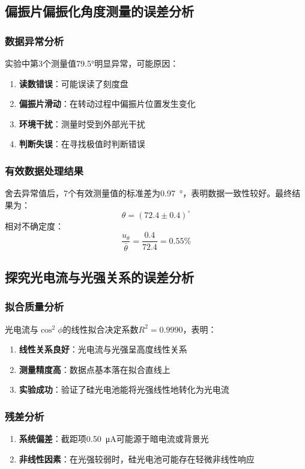 \documentclass[10pt,a4paper]{ctexart}
\begin{document}
\subsection{偏振片偏振化角度测量的误差分析}

\subsubsection{数据异常分析}
实验中第3个测量值\ang{79.5}明显异常，可能原因：
\begin{enumerate}
    \item \textbf{读数错误}：可能误读了刻度盘
    \item \textbf{偏振片滑动}：在转动过程中偏振片位置发生变化
    \item \textbf{环境干扰}：测量时受到外部光干扰
    \item \textbf{判断失误}：在寻找极值时判断错误
\end{enumerate}

\subsubsection{有效数据处理结果}
舍去异常值后，7个有效测量值的标准差为\SI{0.97}{\degree}，表明数据一致性较好。最终结果为：
\[
\theta = (72.4 \pm 0.4)^\circ
\]
相对不确定度：
\[
\frac{u_\theta}{\bar{\theta}} = \frac{0.4}{72.4} = 0.55\%
\]

\subsection{探究光电流与光强关系的误差分析}

\subsubsection{拟合质量分析}
光电流与$\cos^2\phi$的线性拟合决定系数$R^2=0.9990$，表明：
\begin{enumerate}
    \item \textbf{线性关系良好}：光电流与光强呈高度线性关系
    \item \textbf{测量精度高}：数据点基本落在拟合直线上
    \item \textbf{实验成功}：验证了硅光电池能将光强线性地转化为光电流
\end{enumerate}

\subsubsection{残差分析}
\begin{enumerate}
    \item \textbf{系统偏差}：截距项\SI{0.50}{\micro\ampere}可能源于暗电流或背景光
    \item \textbf{非线性因素}：在光强较弱时，硅光电池可能存在轻微非线性响应
\end{enumerate}
\end{document}
